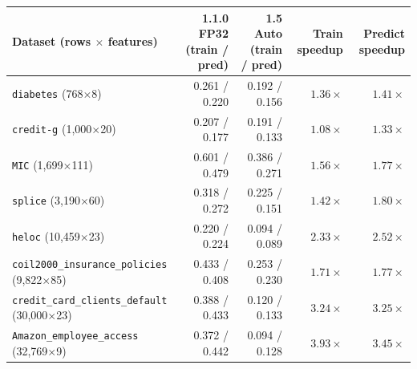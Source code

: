 \begin{tabular}{lrrrr}
\toprule
Dataset (rows $\times$ features) & 1.1.0 FP32 (train / pred) & 1.5 Auto (train / pred) & Train speedup & Predict speedup \\
\midrule
\texttt{diabetes} (768$\times$8) & 0.261 / 0.220 & 0.192 / 0.156 & $1.36\times$ & $1.41\times$ \\
\texttt{credit-g} (1,000$\times$20) & 0.207 / 0.177 & 0.191 / 0.133 & $1.08\times$ & $1.33\times$ \\
\texttt{MIC} (1,699$\times$111) & 0.601 / 0.479 & 0.386 / 0.271 & $1.56\times$ & $1.77\times$ \\
\texttt{splice} (3,190$\times$60) & 0.318 / 0.272 & 0.225 / 0.151 & $1.42\times$ & $1.80\times$ \\
\texttt{heloc} (10,459$\times$23) & 0.220 / 0.224 & 0.094 / 0.089 & $2.33\times$ & $2.52\times$ \\
\texttt{coil2000\_insurance\_policies} (9,822$\times$85) & 0.433 / 0.408 & 0.253 / 0.230 & $1.71\times$ & $1.77\times$ \\
\texttt{credit\_card\_clients\_default} (30,000$\times$23) & 0.388 / 0.433 & 0.120 / 0.133 & $3.24\times$ & $3.25\times$ \\
\texttt{Amazon\_employee\_access} (32,769$\times$9) & 0.372 / 0.442 & 0.094 / 0.128 & $3.93\times$ & $3.45\times$ \\
\bottomrule
\end{tabular}
